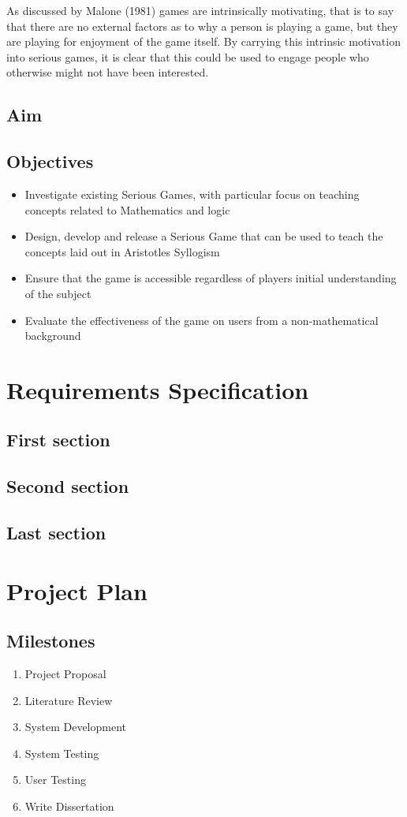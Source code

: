 \documentclass[12pt,a4paper]{report}
\begin{document}
As discussed by Malone (1981) games are intrinsically motivating, that is to say that there are no external factors as to why a person is playing a game, but they are playing for enjoyment of the game itself. By carrying this intrinsic motivation into serious games, it is clear that this could be used to engage people who otherwise might not have been interested. 

\section{Aim}
\section{Objectives}
\begin{itemize}
  \item Investigate existing Serious Games, with particular focus on teaching concepts related to Mathematics and logic

  \item Design, develop and release a Serious Game that can be used to teach the concepts laid out in Aristotle\textsc{}s Syllogism
  \item Ensure that the game is accessible regardless of players initial understanding of the subject
  \item Evaluate the effectiveness of the game on users from a non-mathematical background
  
\end{itemize}
\chapter{Requirements Specification}
\section{First section}
\section{Second section}
\section{Last section}
\chapter{Project Plan}
\section{Milestones}
\begin{enumerate}
  \item Project Proposal
  \item Literature Review
  \item System Development
  \item System Testing
  \item User Testing
  \item Write Dissertation
\end{enumerate}
\end{document}
